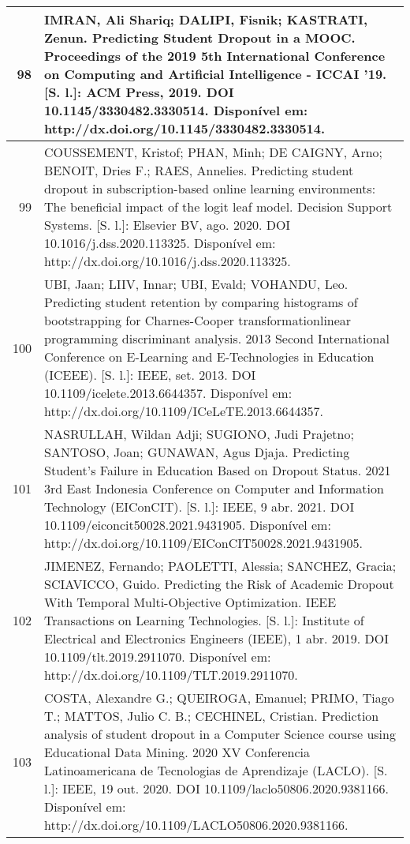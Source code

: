 \begin{apendicesenv}
\begin{longtable}[c]{|r|l|}
98 &
  \multicolumn{1}{p{14.5cm}|}{IMRAN, Ali Shariq; DALIPI, Fisnik; KASTRATI, Zenun. Predicting Student Dropout in a MOOC. Proceedings of the 2019 5th International Conference on Computing and Artificial Intelligence - ICCAI ’19. {[}S. l.{]}: ACM Press, 2019. DOI 10.1145/3330482.3330514. Disponível em: http://dx.doi.org/10.1145/3330482.3330514.} \\ \hline
99 &
  \multicolumn{1}{p{14.5cm}|}{COUSSEMENT, Kristof; PHAN, Minh; DE CAIGNY, Arno; BENOIT, Dries F.; RAES, Annelies. Predicting student dropout in subscription-based online learning environments: The beneficial impact of the logit leaf model. Decision Support Systems. {[}S. l.{]}: Elsevier BV, ago. 2020. DOI 10.1016/j.dss.2020.113325. Disponível em: http://dx.doi.org/10.1016/j.dss.2020.113325.} \\ \hline
100 &
  \multicolumn{1}{p{14.5cm}|}{UBI, Jaan; LIIV, Innar; UBI, Evald; VOHANDU, Leo. Predicting student retention by comparing histograms of bootstrapping for Charnes-Cooper transformationlinear programming discriminant analysis. 2013 Second International Conference on E-Learning and E-Technologies in Education (ICEEE). {[}S. l.{]}: IEEE, set. 2013. DOI 10.1109/icelete.2013.6644357. Disponível em: http://dx.doi.org/10.1109/ICeLeTE.2013.6644357.} \\ \hline
101 &
  \multicolumn{1}{p{14.5cm}|}{NASRULLAH, Wildan Adji; SUGIONO, Judi Prajetno; SANTOSO, Joan; GUNAWAN, Agus Djaja. Predicting Student’s Failure in Education Based on Dropout Status. 2021 3rd East Indonesia Conference on Computer and Information Technology (EIConCIT). {[}S. l.{]}: IEEE, 9 abr. 2021. DOI 10.1109/eiconcit50028.2021.9431905. Disponível em: http://dx.doi.org/10.1109/EIConCIT50028.2021.9431905.} \\ \hline
102 &
  \multicolumn{1}{p{14.5cm}|}{JIMENEZ, Fernando; PAOLETTI, Alessia; SANCHEZ, Gracia; SCIAVICCO, Guido. Predicting the Risk of Academic Dropout With Temporal Multi-Objective Optimization. IEEE Transactions on Learning Technologies. {[}S. l.{]}: Institute of Electrical and Electronics Engineers (IEEE), 1 abr. 2019. DOI 10.1109/tlt.2019.2911070. Disponível em: http://dx.doi.org/10.1109/TLT.2019.2911070.} \\ \hline
103 &
  \multicolumn{1}{p{14.5cm}|}{COSTA, Alexandre G.; QUEIROGA, Emanuel; PRIMO, Tiago T.; MATTOS, Julio C. B.; CECHINEL, Cristian. Prediction analysis of student dropout in a Computer Science course using Educational Data Mining. 2020 XV Conferencia Latinoamericana de Tecnologias de Aprendizaje (LACLO). {[}S. l.{]}: IEEE, 19 out. 2020. DOI 10.1109/laclo50806.2020.9381166. Disponível em: http://dx.doi.org/10.1109/LACLO50806.2020.9381166.} \\ \hline

\end{longtable}
\end{apendicesenv}

